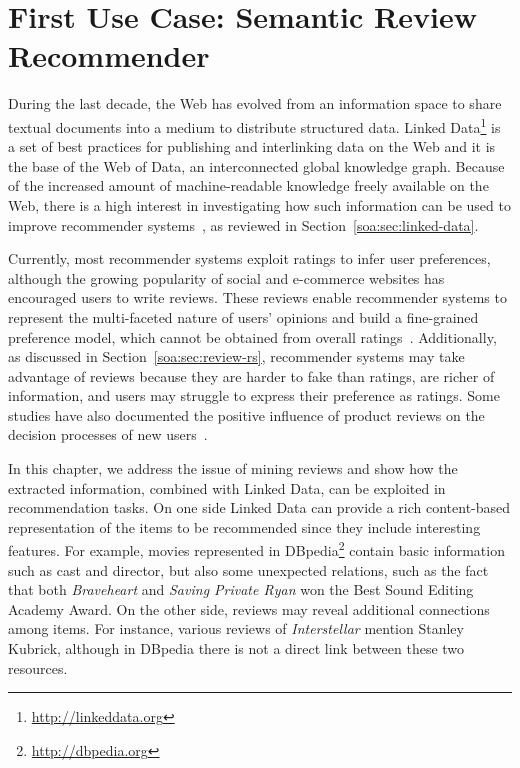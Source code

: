 \chapter{First Use Case: Semantic Review Recommender}
\graphicspath{{Chapter08/Figures/}}
\label{chap:semrevrec}

During the last decade, the Web has evolved from an information space to share textual documents into a medium to distribute structured data. Linked Data\footnote{\url{http://linkeddata.org}} is a set of best practices for publishing and interlinking data on the Web and it is the base of the Web of Data, an interconnected global knowledge graph. Because of the increased amount of machine-readable knowledge freely available on the Web, there is a high interest in investigating how such information can be used to improve recommender systems~\cite{Figueroa2015}, as reviewed in Section~\ref{soa:sec:linked-data}.

Currently, most recommender systems exploit ratings to infer user preferences, although the growing popularity of social and e-commerce websites has encouraged users to write reviews. These reviews enable recommender systems to represent the multi-faceted nature of users' opinions and build a fine-grained preference model, which cannot be obtained from overall ratings~\cite{Chen2015}. Additionally, as discussed in Section~\ref{soa:sec:review-rs}, recommender systems may take advantage of reviews because they are harder to fake than ratings, are richer of information, and users may struggle to express their preference as ratings. Some studies have also documented the positive influence of product reviews on the decision processes of new users~\cite{Chatterjee2001, Kim2007}.

In this chapter, we address the issue of mining reviews and show how the extracted information, combined with Linked Data, can be exploited in recommendation tasks. On one side Linked Data can provide a rich content-based representation of the items to be recommended since they include interesting features. For example, movies represented in DBpedia\footnote{\url{http://dbpedia.org}} contain basic information such as cast and director, but also some unexpected relations, such as the fact that both \emph{Braveheart} and \emph{Saving Private Ryan} won the Best Sound Editing Academy Award. On the other side, reviews may reveal additional connections among items.
For instance, various reviews of \emph{Interstellar} mention Stanley Kubrick, although in DBpedia there is not a direct link between these two resources.
 
